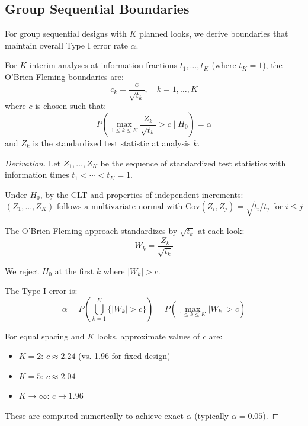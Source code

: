 \subsection{Group Sequential Boundaries}

For group sequential designs with $K$ planned looks, we derive boundaries that maintain overall Type I error rate $\alpha$.

\begin{theorem}
For $K$ interim analyses at information fractions $t_1, \ldots, t_K$ (where $t_K = 1$), the O'Brien-Fleming boundaries are:
\begin{equation}
c_k = \frac{c}{\sqrt{t_k}}, \quad k = 1, \ldots, K
\end{equation}
where $c$ is chosen such that:
\begin{equation}
P\left(\max_{1 \leq k \leq K} \frac{Z_k}{\sqrt{t_k}} > c \mid H_0\right) = \alpha
\end{equation}
and $Z_k$ is the standardized test statistic at analysis $k$.
\end{theorem}

\begin{proof}[Derivation]
Let $Z_1, \ldots, Z_K$ be the sequence of standardized test statistics with information times $t_1 < \cdots < t_K = 1$.

Under $H_0$, by the CLT and properties of independent increments:
\begin{equation}
(Z_1, \ldots, Z_K) \text{ follows a multivariate normal with } \text{Cov}(Z_i, Z_j) = \sqrt{t_i/t_j} \text{ for } i \leq j
\end{equation}

The O'Brien-Fleming approach standardizes by $\sqrt{t_k}$ at each look:
\begin{equation}
W_k = \frac{Z_k}{\sqrt{t_k}}
\end{equation}

We reject $H_0$ at the first $k$ where $|W_k| > c$.

The Type I error is:
\begin{equation}
\alpha = P\left(\bigcup_{k=1}^K \{|W_k| > c\}\right) = P\left(\max_{1 \leq k \leq K} |W_k| > c\right)
\end{equation}

For equal spacing and $K$ looks, approximate values of $c$ are:
\begin{itemize}
    \item $K=2$: $c \approx 2.24$ (vs. 1.96 for fixed design)
    \item $K=5$: $c \approx 2.04$
    \item $K \to \infty$: $c \to 1.96$
\end{itemize}

These are computed numerically to achieve exact $\alpha$ (typically $\alpha = 0.05$).
\end{proof}


